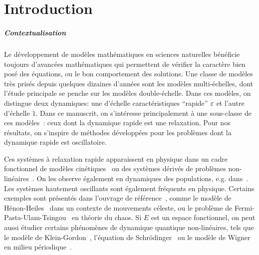 \chapter*{Introduction}


\paragraph{Contextualisation\\}

Le développement de modèles mathématiques en sciences naturelles bénéficie toujours d'avancées mathématiques qui permettent de vérifier la caractère bien posé des équations, ou le bon comportement des solutions. Une classe de modèles très prisés depuis quelques dizaines d'années sont les modèles multi-échelles, dont l'étude principale se penche sur les modèles double-échelle. Dans ces modèles, on distingue deux dynamiques: une d'échelle caractéristiques \enquote{rapide} $\varepsilon$ et l'autre d'échelle $1$. Dans ce manuscrit, on s'intéresse principalement à une sous-classe de ces modèles~: ceux dont la dynamique rapide est une relaxation. Pour nos résultats, on s'inspire de méthodes développées pour les problèmes dont la dynamique rapide est oscillatoire. 


Ces systèmes à relaxation rapide apparaissent en physique dans un cadre fonctionnel de modèles cinétiques~\cite{bhatnagar.1954.model,lemou.2008.new} ou des systèmes dérivés de problèmes non-linéaires~\cite{jin.1995.relaxation}. On les observe également en dynamiques des populations, e.g. dans~\cite{greiner.1994.singular,auger.1996.emergence,sanchez.2000.singular,castella.2018.analysis}. Les systèmes hautement oscillants sont également fréquents en physique. Certains exemples sont présentés dans l'ouvrage de référence~\cite[Chap.~I]{hairer.2006.geometric}, comme le modèle de Hénon-Heiles~\cite{henon.1964.applicability} dans un contexte de mouvements céleste, ou le problème de Fermi-Pasta-Ulam-Tsingou~\cite{ford.1992.fermi} en théorie du chaos. Si $E$ est un espace fonctionnel, on peut aussi étudier certains phénomènes de dynamique quantique non-linéaires, tels que le modèle de Klein-Gordon~\cite{bao.2012.analysis}, l'équation de Schrödinger~\cite{grebert.2011.energy} ou le modèle de Wigner en milieu périodique~\cite{crouseilles.2017.nonlinear,morandi.2011.wigner}.


